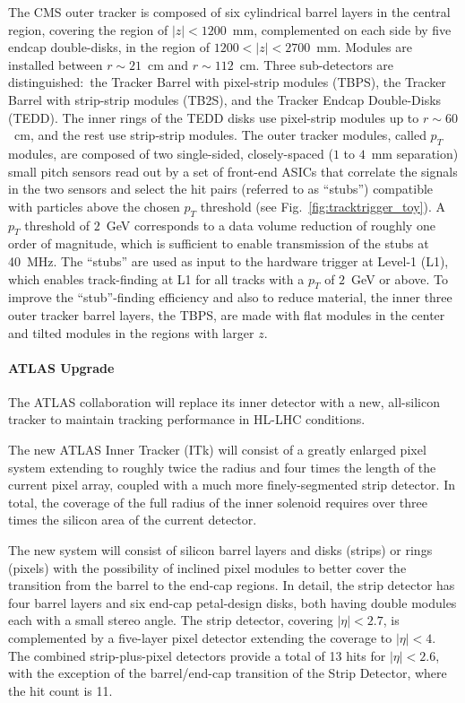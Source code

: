 The CMS outer tracker is composed of six cylindrical barrel layers in the central region, covering the region of $|z| < 1200$~mm, complemented on each side by five endcap double-disks, in the region of $1200 < |z| < 2700$~mm. Modules are installed between $r\sim21$~cm and $r\sim112$~cm. Three sub-detectors are distinguished:~the Tracker Barrel with pixel-strip modules (TBPS), the Tracker Barrel with strip-strip modules (TB2S), and the Tracker Endcap Double-Disks (TEDD). The inner rings of the TEDD disks use pixel-strip modules up to $r\sim 60$~cm, and the rest use strip-strip modules. The outer tracker modules, called $p_T$ modules, are composed of two single-sided, closely-spaced ($1$ to $4$~mm separation) small pitch sensors read out by a set of front-end ASICs that correlate the signals in the two sensors and select the hit pairs (referred to as ``stubs'') compatible with particles above the chosen $p_T$ threshold (see Fig.~\ref{fig:tracktrigger_toy}). A $p_T$ threshold of $2$~GeV corresponds to a data volume reduction of roughly one order of magnitude, which is sufficient to enable transmission of the stubs at 40~MHz.
The ``stubs'' are used as input to the hardware trigger at Level-1 (L1), which enables track-finding at L1 for all tracks with a $p_T$ of $2$~GeV or above. To improve the ``stub''-finding efficiency and also to reduce material, the inner three outer tracker barrel layers, the TBPS, are made with flat modules in the center and tilted modules in the regions with larger $z$.

\paragraph{ATLAS Upgrade}
The ATLAS collaboration will replace its inner detector with a new, all-silicon tracker to maintain tracking performance in HL-LHC conditions.

The new ATLAS Inner Tracker (ITk) will consist of a greatly enlarged pixel system extending to roughly twice the radius and four times the length of the current pixel array, coupled with a much more finely-segmented strip detector. In total, the coverage of the full radius of the inner solenoid requires over three times the silicon area of the current detector.

The new system will consist of silicon barrel layers and disks (strips) or rings (pixels) with the possibility of inclined pixel modules to better cover the transition from the barrel to the end-cap regions. In detail, the strip detector has four barrel layers and six end-cap petal-design disks, both having double modules each with a small stereo angle. The strip detector, covering $|\eta|< 2.7$, is complemented by a five-layer pixel detector extending the coverage to $|\eta |< 4$. The combined strip-plus-pixel detectors provide a total of 13 hits for $|\eta| < 2.6$, with the exception of the barrel/end-cap transition of the Strip Detector, where the hit count is 11.

